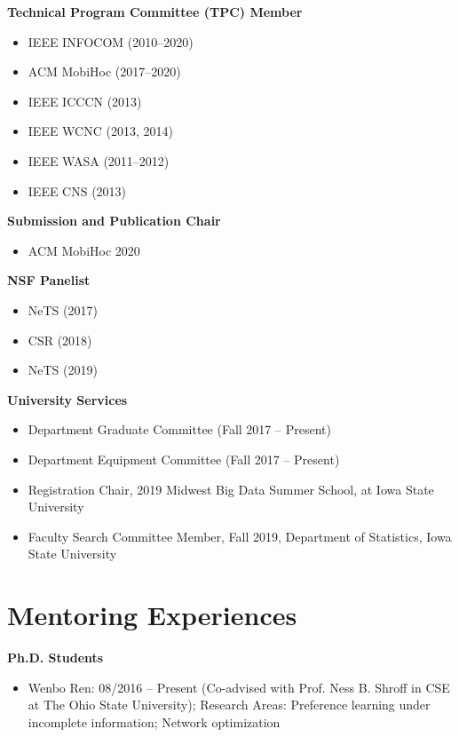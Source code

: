 \documentclass[overlapped,line,letterpaper]{res1}
\begin{document}
\begin{resume}
\hspace{-.55in} {\bf Technical Program Committee (TPC) Member}
\vspace{.16in}
\begin{itemize}
\item IEEE INFOCOM (2010--2020)
\item ACM MobiHoc (2017--2020)
\item IEEE ICCCN (2013)
\item IEEE WCNC (2013, 2014)
\item IEEE WASA (2011--2012)
\item IEEE CNS (2013)
\end{itemize}

\hspace{-.55in} {\bf Submission and Publication Chair}
\vspace{.16in}
\begin{itemize}
\item ACM MobiHoc 2020
\end{itemize}

\hspace{-.55in} {\bf NSF Panelist}
\vspace{.16in}
\begin{itemize}
\item NeTS (2017)
\item CSR (2018)
\item NeTS (2019)
\end{itemize}

\hspace{-.55in} {\bf University Services}
\vspace{.16in}
\begin{itemize}
\item Department Graduate Committee (Fall 2017 --  Present)
\item Department Equipment Committee (Fall 2017 --  Present)
\item Registration Chair,  2019 Midwest Big Data Summer School, at Iowa State University
\item Faculty Search Committee Member, Fall 2019, Department of Statistics, Iowa State University
\end{itemize}


\section{\bf \large Mentoring Experiences}
\vspace{.16in}
\hspace{-.55in} {\bf Ph.D. Students}
\vspace{.16in}
\begin{itemize}
\item Wenbo Ren: 08/2016 -- Present (Co-advised with Prof. Ness B. Shroff 
in CSE at The Ohio State University); Research Areas: Preference learning under incomplete information; Network optimization


\end{itemize}
\end{resume}
\end{document}
